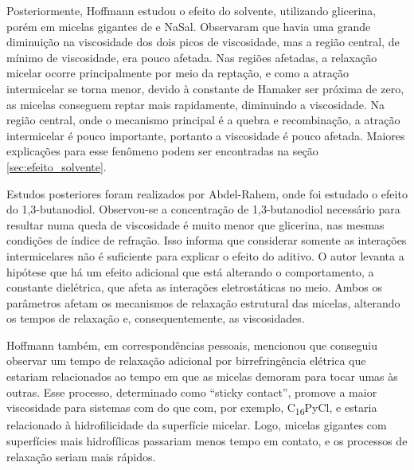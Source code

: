 		
		
		Posteriormente, Hoffmann estudou o efeito do solvente, utilizando glicerina, porém em micelas gigantes de \CTAB{} e NaSal. Observaram que havia uma grande diminuição na viscosidade dos dois picos de viscosidade, mas a região central, de mínimo de viscosidade, era pouco afetada. Nas regiões afetadas, a relaxação micelar ocorre principalmente por meio da reptação, e como a atração intermicelar se torna menor, devido à constante de Hamaker ser próxima de zero, as micelas conseguem reptar mais rapidamente, diminuindo a viscosidade. Na região central, onde o mecanismo principal é a quebra e recombinação, a atração intermicelar é pouco importante, portanto a viscosidade é pouco afetada. Maiores explicações para esse fenômeno podem ser encontradas na seção \ref{sec:efeito_solvente}. 
		
		Estudos posteriores foram realizados por Abdel-Rahem, onde foi estudado o efeito do 1,3-butanodiol. Observou-se a concentração de 1,3-butanodiol necessário para resultar numa queda de viscosidade é muito menor que glicerina, nas mesmas condições de índice de refração. Isso informa que considerar somente as interações intermicelares não é suficiente para explicar o efeito do aditivo. O autor levanta a hipótese que há um efeito adicional que está alterando o comportamento, a constante dielétrica, que afeta as interações eletrostáticas no meio. Ambos os parâmetros afetam os mecanismos de relaxação estrutural das micelas, alterando os tempos de relaxação e, consequentemente, as viscosidades. 
		
		
		Hoffmann também, em correspondências pessoais, mencionou que conseguiu observar um tempo de relaxação adicional por birrefringência elétrica que estariam relacionados ao tempo em que as micelas demoram para tocar umas às outras. Esse processo, determinado como ``sticky contact'', promove a maior viscosidade para sistemas com \CTAB{} do que com, por exemplo, C\textsubscript{16}PyCl, e estaria relacionado à hidrofilicidade da superfície micelar. Logo, micelas gigantes com superfícies mais hidrofílicas passariam menos tempo em contato, e os processos de relaxação seriam mais rápidos. 
		
